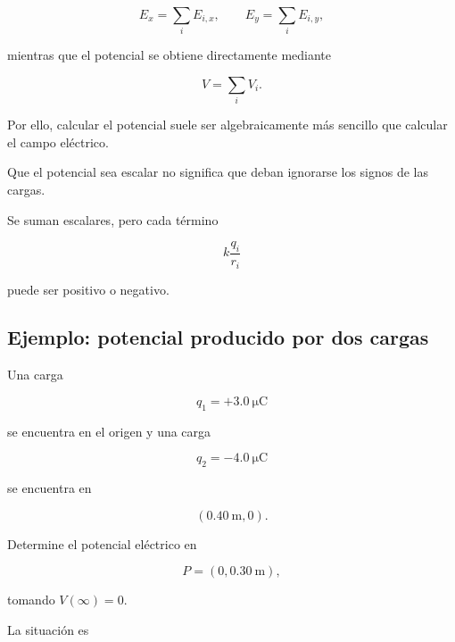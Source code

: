 \[
E_x=\sum_iE_{i,x},
\qquad
E_y=\sum_iE_{i,y},
\]

mientras que el potencial se obtiene directamente mediante

\[
V=\sum_iV_i.
\]

Por ello, calcular el potencial suele ser algebraicamente más sencillo que calcular
el campo eléctrico.

\begin{advertencia}

Que el potencial sea escalar no significa que deban ignorarse los signos de las
cargas.

Se suman escalares, pero cada término

\[
k\frac{q_i}{r_i}
\]

puede ser positivo o negativo.

\end{advertencia}


\subsection{Ejemplo: potencial producido por dos cargas}

\begin{ejemplo}

Una carga

\[
q_1=+\SI{3.0}{\micro\coulomb}
\]

se encuentra en el origen y una carga

\[
q_2=-\SI{4.0}{\micro\coulomb}
\]

se encuentra en

\[
(\SI{0.40}{\metre},0).
\]

Determine el potencial eléctrico en

\[
P=(0,\SI{0.30}{\metre}),
\]

tomando \(V(\infty)=0\).

\end{ejemplo}

La situación es

\begin{center}
\end{center}

